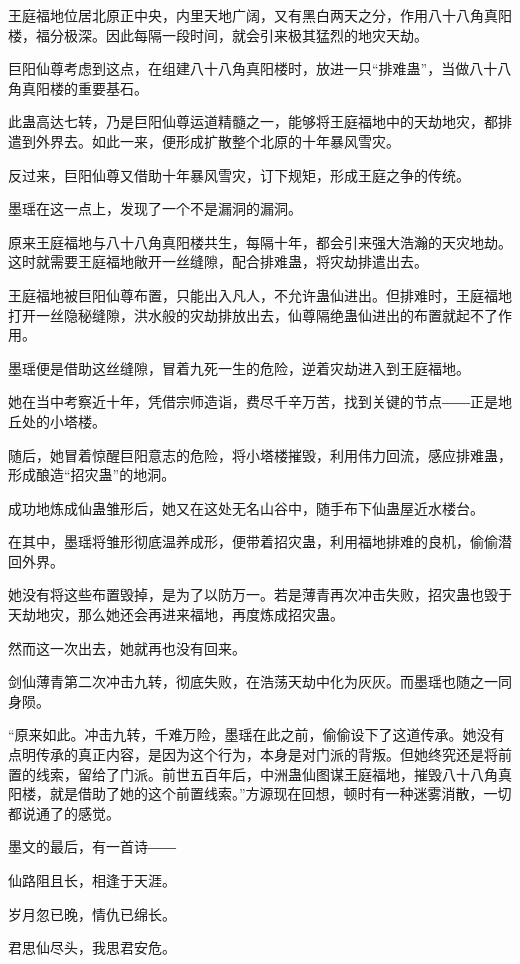 \begin{this_body}
王庭福地位居北原正中央，内里天地广阔，又有黑白两天之分，作用八十八角真阳楼，福分极深。因此每隔一段时间，就会引来极其猛烈的地灾天劫。

巨阳仙尊考虑到这点，在组建八十八角真阳楼时，放进一只“排难蛊”，当做八十八角真阳楼的重要基石。

此蛊高达七转，乃是巨阳仙尊运道精髓之一，能够将王庭福地中的天劫地灾，都排遣到外界去。如此一来，便形成扩散整个北原的十年暴风雪灾。

反过来，巨阳仙尊又借助十年暴风雪灾，订下规矩，形成王庭之争的传统。

墨瑶在这一点上，发现了一个不是漏洞的漏洞。

原来王庭福地与八十八角真阳楼共生，每隔十年，都会引来强大浩瀚的天灾地劫。这时就需要王庭福地敞开一丝缝隙，配合排难蛊，将灾劫排遣出去。

王庭福地被巨阳仙尊布置，只能出入凡人，不允许蛊仙进出。但排难时，王庭福地打开一丝隐秘缝隙，洪水般的灾劫排放出去，仙尊隔绝蛊仙进出的布置就起不了作用。

墨瑶便是借助这丝缝隙，冒着九死一生的危险，逆着灾劫进入到王庭福地。

她在当中考察近十年，凭借宗师造诣，费尽千辛万苦，找到关键的节点――正是地丘处的小塔楼。

随后，她冒着惊醒巨阳意志的危险，将小塔楼摧毁，利用伟力回流，感应排难蛊，形成酿造“招灾蛊”的地洞。

成功地炼成仙蛊雏形后，她又在这处无名山谷中，随手布下仙蛊屋近水楼台。

在其中，墨瑶将雏形彻底温养成形，便带着招灾蛊，利用福地排难的良机，偷偷潜回外界。

她没有将这些布置毁掉，是为了以防万一。若是薄青再次冲击失败，招灾蛊也毁于天劫地灾，那么她还会再进来福地，再度炼成招灾蛊。

然而这一次出去，她就再也没有回来。

剑仙薄青第二次冲击九转，彻底失败，在浩荡天劫中化为灰灰。而墨瑶也随之一同身陨。

“原来如此。冲击九转，千难万险，墨瑶在此之前，偷偷设下了这道传承。她没有点明传承的真正内容，是因为这个行为，本身是对门派的背叛。但她终究还是将前置的线索，留给了门派。前世五百年后，中洲蛊仙图谋王庭福地，摧毁八十八角真阳楼，就是借助了她的这个前置线索。”方源现在回想，顿时有一种迷雾消散，一切都说通了的感觉。

墨文的最后，有一首诗――

仙路阻且长，相逢于天涯。

岁月忽已晚，情仇已绵长。

君思仙尽头，我思君安危。


\end{this_body}
